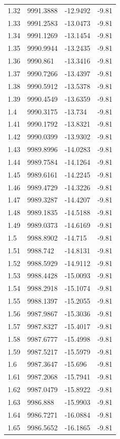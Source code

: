 \begin{table}[H]
\begin{tabular}{llll}
1.32 & 9991.3888 & -12.9492 & -9.81 \\
1.33 & 9991.2583 & -13.0473 & -9.81 \\
1.34 & 9991.1269 & -13.1454 & -9.81 \\
1.35 & 9990.9944 & -13.2435 & -9.81 \\
1.36 & 9990.861 & -13.3416 & -9.81 \\
1.37 & 9990.7266 & -13.4397 & -9.81 \\
1.38 & 9990.5912 & -13.5378 & -9.81 \\
1.39 & 9990.4549 & -13.6359 & -9.81 \\
1.4 & 9990.3175 & -13.734 & -9.81 \\
1.41 & 9990.1792 & -13.8321 & -9.81 \\
1.42 & 9990.0399 & -13.9302 & -9.81 \\
1.43 & 9989.8996 & -14.0283 & -9.81 \\
1.44 & 9989.7584 & -14.1264 & -9.81 \\
1.45 & 9989.6161 & -14.2245 & -9.81 \\
1.46 & 9989.4729 & -14.3226 & -9.81 \\
1.47 & 9989.3287 & -14.4207 & -9.81 \\
1.48 & 9989.1835 & -14.5188 & -9.81 \\
1.49 & 9989.0373 & -14.6169 & -9.81 \\
1.5 & 9988.8902 & -14.715 & -9.81 \\
1.51 & 9988.742 & -14.8131 & -9.81 \\
1.52 & 9988.5929 & -14.9112 & -9.81 \\
1.53 & 9988.4428 & -15.0093 & -9.81 \\
1.54 & 9988.2918 & -15.1074 & -9.81 \\
1.55 & 9988.1397 & -15.2055 & -9.81 \\
1.56 & 9987.9867 & -15.3036 & -9.81 \\
1.57 & 9987.8327 & -15.4017 & -9.81 \\
1.58 & 9987.6777 & -15.4998 & -9.81 \\
1.59 & 9987.5217 & -15.5979 & -9.81 \\
1.6 & 9987.3647 & -15.696 & -9.81 \\
1.61 & 9987.2068 & -15.7941 & -9.81 \\
1.62 & 9987.0479 & -15.8922 & -9.81 \\
1.63 & 9986.888 & -15.9903 & -9.81 \\
1.64 & 9986.7271 & -16.0884 & -9.81 \\
1.65 & 9986.5652 & -16.1865 & -9.81 \\

\end{tabular}
\end{table}
